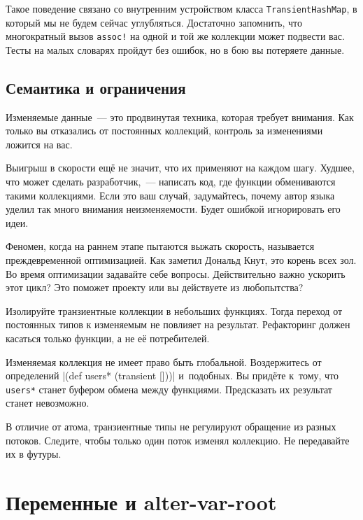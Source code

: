 Такое поведение связано со внутренним устройством класса
\texttt{Tran\-si\-ent\-Hash\-Map}, в который мы не будем сейчас
углубляться. Достаточно запомнить, что многократный вызов \verb|assoc!| на одной
и той же коллекции может подвести вас. Тесты на малых словарях пройдут без
ошибок, но в бою вы потеряете данные.

\subsection{Семантика и ограничения}

Изменяемые данные~--- это продвинутая техника, которая требует внимания. Как только
вы отказались от постоянных коллекций, контроль за изменениями ложится на вас.

Выигрыш в скорости ещё не значит, что их применяют на каждом шагу. Худшее, что
может сделать разработчик,~--- написать код, где функции обмениваются такими
коллекциями. Если это ваш случай, задумайтесь, почему автор языка уделил так
много внимания неизменяемости. Будет ошибкой игнорировать его идеи.


Феномен, когда на раннем этапе пытаются выжать скорость, называется
преждевременной оптимизацией. Как заметил Дональд Кнут, это корень всех зол. Во
время оптимизации задавайте себе вопросы. Действительно важно ускорить этот
цикл? Это поможет проекту или вы действуете из любопытства?

Изолируйте транзиентные коллекции в небольших функциях. Тогда переход от
постоянных типов к изменяемым не повлияет на результат. Рефакторинг должен
касаться только функции, а не её потребителей.

Изменяемая коллекция не имеет право быть глобальной. Воздержитесь от определений
\spverb|(def users* (transient []))| и~подобных. Вы придёте к~тому, что
\verb|users*| станет буфером обмена между функциями. Предсказать их результат
станет невозможно.

В отличие от атома, транзиентные типы не регулируют обращение из разных
потоков. Следите, чтобы только один поток изменял коллекцию. Не передавайте их в
футуры.

\section{Переменные и alter-var-root}


\label{alter-var-root}


